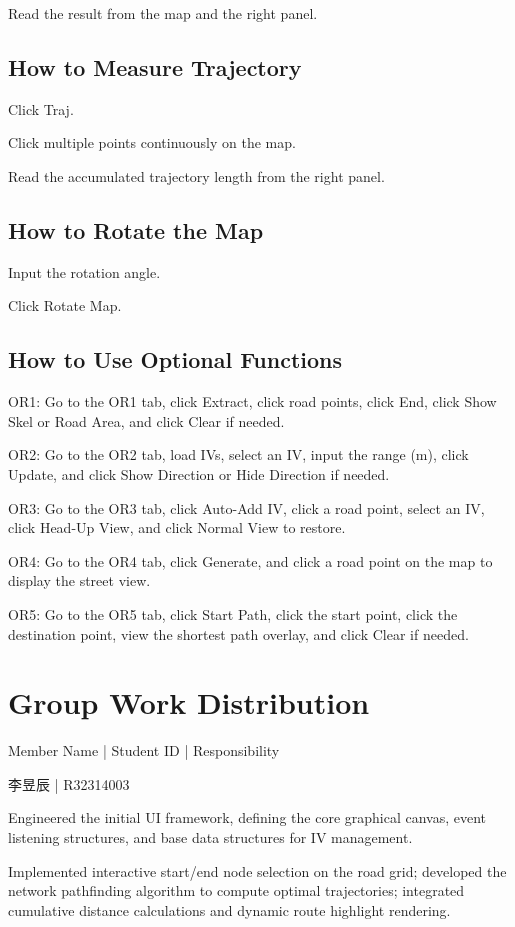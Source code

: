 \documentclass[12pt,a4paper]{ctexart}
\begin{document}
Read the result from the map and the right panel.

\subsection{How to Measure Trajectory}

Click Traj.

Click multiple points continuously on the map.

Read the accumulated trajectory length from the right panel.

\subsection{How to Rotate the Map}

Input the rotation angle.

Click Rotate Map.

\subsection{How to Use Optional Functions}

OR1: Go to the OR1 tab, click Extract, click road points, click End, click Show Skel or Road Area, and click Clear if needed.

OR2: Go to the OR2 tab, load IVs, select an IV, input the range (m), click Update, and click Show Direction or Hide Direction if needed.

OR3: Go to the OR3 tab, click Auto-Add IV, click a road point, select an IV, click Head-Up View, and click Normal View to restore.

OR4: Go to the OR4 tab, click Generate, and click a road point on the map to display the street view.

OR5: Go to the OR5 tab, click Start Path, click the start point, click the destination point, view the shortest path overlay, and click Clear if needed.

\section{Group Work Distribution}

Member Name | Student ID | Responsibility

李昱辰 | R32314003

Engineered the initial UI framework, defining the core graphical canvas, event listening structures, and base data structures for IV management.

Implemented interactive start/end node selection on the road grid; developed the network pathfinding algorithm to compute optimal trajectories; integrated cumulative distance calculations and dynamic route highlight rendering.
\end{document}
